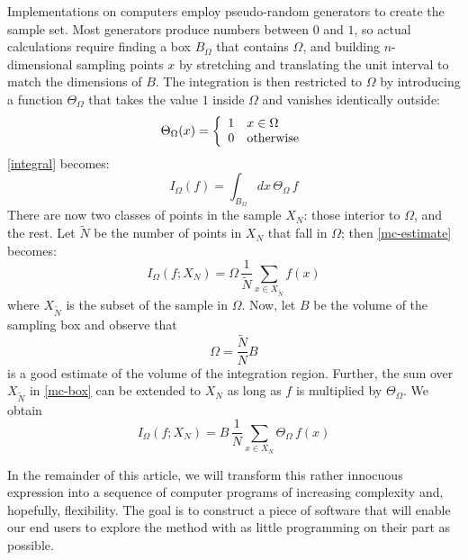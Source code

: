 Implementations on computers employ pseudo-random generators to create the sample set. Most
generators produce numbers between $0$ and $1$, so actual calculations require finding a box
$B_{\Omega}$ that contains $\Omega$, and building $n$-dimensional sampling points $x$ by
stretching and translating the unit interval to match the dimensions of $B$. The integration is
then restricted to $\Omega$ by introducing a function $\Theta_{\Omega}$ that takes the value $1$
inside $\Omega$ and vanishes identically outside:
%
\begin{equation}
  \Theta_{\Omega}(x)
  =
  \left\{
  \begin{array}{ll}
  1 & x \in \Omega \\
  0 & {\rm otherwise}
  \end{array}
  \right.
\label{eq:theta}
\end{equation}
%
\eqref{integral} becomes:
%
\begin{equation}
  I_{\Omega} (f)
  =
  \int_{B_{\Omega}} dx \, \Theta_{\Omega} \, f
\label{eq:integral-box}
\end{equation}
%
There are now two classes of points in the sample $X_{N}$: those interior to $\Omega$, and the
rest. Let $\tilde{N}$ be the number of points in $X_{N}$ that fall in $\Omega$; then
\eqref{mc-estimate} becomes:
%
\begin{equation}
  I_{\Omega} (f; X_{N})
  =
  \Omega \, \frac{1}{\tilde{N}} \sum_{x \in X_{\tilde{N}}} f(x)
\label{eq:mc-box}
\end{equation}
%
where $X_{\tilde{N}}$ is the subset of the sample in $\Omega$. Now, let $B$ be the volume
of the sampling box and observe that
%
\begin{equation}
  \Omega
  =
  \frac{\tilde{N}}{N} B
\label{eq:volume-estimate}
\end{equation}
%
is a good estimate of the volume of the integration region. Further, the sum over
$X_{\tilde{N}}$ in \eqref{mc-box} can be extended to $X_{N}$ as long as $f$ is
multiplied by $\Theta_{\Omega}$. We obtain
%
\begin{equation}
  I_{\Omega} (f; X_{N})
  =
  B \, \frac{1}{N} \sum_{x \in X_{N}} \Theta_{\Omega} \, f(x)
\label{eq:mc}
\end{equation}
%

In the remainder of this article, we will transform this rather innocuous expression into
a sequence of computer programs of increasing complexity and, hopefully, flexibility. The
goal is to construct a piece of software that will enable our end users to explore the
method with as little programming on their part as possible.

